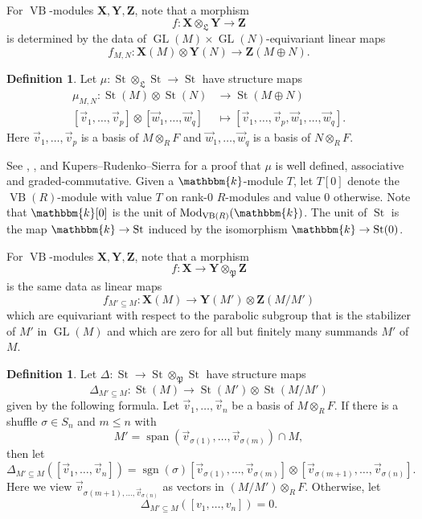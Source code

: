 \documentclass[11pt,letterpaper]{amsart}
\newcommand{\bk}{\mathbbm{k}}
\DeclareMathOperator{\Mod}{Mod}
\DeclareMathOperator{\Span}{span}
\DeclareMathOperator{\VB}{VB}
\newcommand{\gX}{\mathbf{X}}
\newcommand{\gY}{\mathbf{Y}}
\newcommand{\gZ}{\mathbf{Z}}
\newcommand{\PP}{\mathfrak{P}}
\newcommand{\LL}{\mathfrak{L}}
\numberwithin{theoremcounter}{section}
\theoremstyle{definition}
\newtheorem{definition}[Defauto]{Definition}
\theoremstyle{remark}
\DeclareMathOperator*{\sgn}{sgn}
\DeclareMathOperator{\GL}{GL}
\DeclareMathOperator{\St}{St}
\begin{document}
For $\VB$-modules $\gX,\gY,\gZ$, note that a morphism $$f\colon \gX \otimes_\LL \gY \to \gZ $$ is determined by the data of $\GL(M) \times \GL(N)$-equivariant linear maps $$f_{M,N}\colon \gX(M) \otimes \gY(N) \to \gZ(M \oplus N).$$

\begin{definition}
    Let $\mu\colon \St \otimes_\LL \St \to \St$ have structure maps 
    \begin{align*}
        \mu_{M,N}\colon \St(M) \otimes \St(N) &\longrightarrow \St(M \oplus N)\\
        [\vec v_1,\ldots, \vec v_p ] \otimes [\vec w_1,\ldots, \vec w_q ] &\longmapsto [\vec v_1,\ldots, \vec v_p, \vec w_1,\ldots, \vec w_q ]. 
    \end{align*}    
    Here $\vec v_1,\ldots,\vec v_p$ is a basis of $M \otimes_R F$ and $\vec w_1,\ldots,\vec w_q$ is a basis of $N \otimes_R F$. 
\end{definition}

See \cite{MNP}, \cite{AMP}, and Kupers--Rudenko--Sierra \cite{KRS1} for a proof that $\mu$ is well defined, associative and graded-commutative. Given a $\bk$-module $T$, let $T[0]$ denote the $\VB(R)$-module with value $T$ on rank-$0$ $R$-modules and value $0$ otherwise. Note that $\bk[0]$ is the unit of $\Mod_{\VB(R)}(\bk)$. The unit of $\St$ is the map $\bk \to \St$ induced by the isomorphism $\bk \to \St(0)$.

For $\VB$-modules $\gX,\gY,\gZ$, note that a morphism $$f\colon  \gX \to \gY \otimes_\PP \gZ  $$ is the same data as linear maps $$f_{M' \subseteq M}\colon  \gX(M) \to \gY(M') \otimes \gZ(M /M')$$ which are equivariant with respect to the parabolic subgroup that is the stabilizer of $M'$ in $\GL(M)$ and which are zero for all but finitely many summands $M'$ of $M$.

\begin{definition}
    Let $\Delta\colon  \St \to \St \otimes_\PP \St $ have structure maps $$\Delta_{M' \subseteq M}\colon  \St(M) \to \St(M') \otimes \St(M/M') $$ given by the following formula. Let $\vec v_1,\ldots,\vec v_n$ be a basis of $M \otimes_R F$. If there is a shuffle $\sigma \in S_n$ and $m \leq n$ with $$M'=\Span(\vec v_{\sigma(1)},\ldots,\vec v_{\sigma(m)}) \cap M,$$ then let  $$\Delta_{M' \subseteq M} \left( [\vec v_1,\ldots,\vec v_n] \right) = \sgn(\sigma)[\vec v_{\sigma(1)},\ldots,\vec v_{\sigma(m)}] \otimes [\vec v_{\sigma(m+1)},\ldots,\vec v_{\sigma(n)}]. $$ Here we view $\vec v_{\sigma(m+1),\ldots,\vec v_{\sigma(n)}}$ as vectors in $(M/M') \otimes_R F$. Otherwise, let $$\Delta_{M' \subseteq M} \left([v_1,\ldots,v_n]\right) = 0. $$
    
\end{definition}
\end{document}
